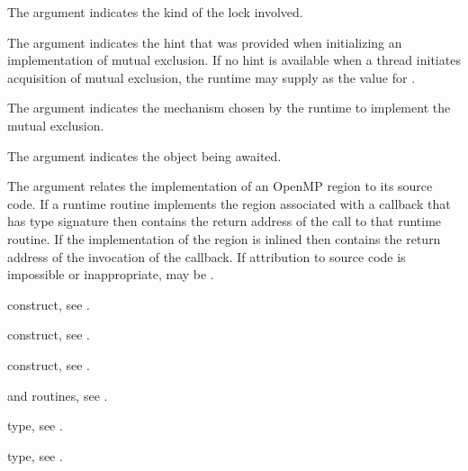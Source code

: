 \argdesc
The  argument indicates the kind of the lock involved.

The  argument indicates the hint that was provided when initializing
an implementation of mutual exclusion. If no hint is available when a thread 
initiates acquisition of mutual exclusion, the runtime may supply 
 as the value for .

The  argument indicates the mechanism chosen by the runtime to implement 
the mutual exclusion.

The  argument indicates the object being awaited.

The  argument relates the implementation of an OpenMP region
to its source code. If a runtime routine implements the region associated with
a callback that has type signature  then
 contains the return address of the call to that runtime routine.
If the implementation of the region is inlined then  contains the
return address of the invocation of the callback. If attribution to source code
is impossible or inappropriate,  may be .

\begin{crossrefs}
\item {} construct, see .

\item {} construct, see .

\item {} construct, see .

\item {} and  routines,
see .

\item {} type, see .

\item {} type, see .
\end{crossrefs}



\subsubsection{}
\label{sec:ompt_callback_mutex_t}


